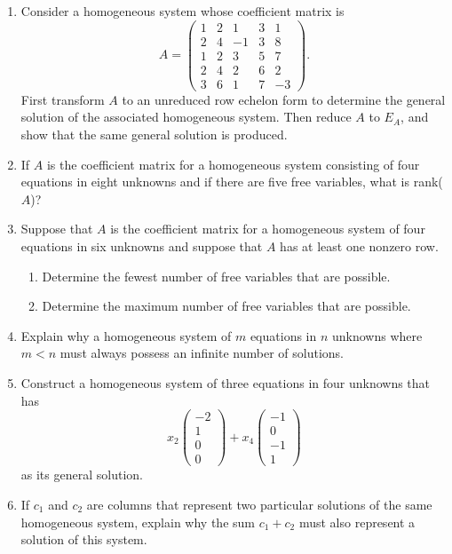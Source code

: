 \begin{enumerate}[leftmargin=*, label=\bfseries 2.4.\arabic*]
\item Consider a homogeneous system whose coefficient matrix is
\[
A = \left(\begin{array}{ccccc}
    1 & 2 & 1 & 3 & 1 \\
    2 & 4 & -1 & 3 & 8 \\
    1 & 2 & 3 & 5 & 7 \\
    2 & 4 & 2 & 6 & 2 \\
    3 & 6 & 1 & 7 & -3
\end{array}\right).
\]
First transform \(A\) to an unreduced row echelon form to determine the
general solution of the associated homogeneous system. Then reduce \(A\)
to \(E_A\), and show that the same general solution is produced.

\item If \(A\) is the coefficient matrix for a homogeneous system consisting of four equations in eight unknowns and if there are five free variables, what is rank(\(A\))?

\item Suppose that \(A\) is the coefficient matrix for a homogeneous system of four equations in six unknowns and suppose that \(A\) has at least one nonzero row.
\begin{enumerate}[label=(\alph*)]
    \item Determine the fewest number of free variables that are possible.
    \item Determine the maximum number of free variables that are possible.
\end{enumerate}

\item Explain why a homogeneous system of \(m\) equations in \(n\) unknowns where \(m < n\) must always possess an infinite number of solutions.

\item Construct a homogeneous system of three equations in four unknowns that has
\[
x_2\left(\begin{array}{cols}
    -2 \\
    1 \\
    0 \\
    0
\end{array}\right)+
x_4\left(\begin{array}{cols}
    -1 \\
    0 \\
    -1 \\
    1
\end{array}\right)
\]
as its general solution.

\item If \(c_1\) and \(c_2\) are columns that represent two particular solutions of the same homogeneous system, explain why the sum \(c_1 + c_2\) must also represent a solution of this system.

\end{enumerate}
